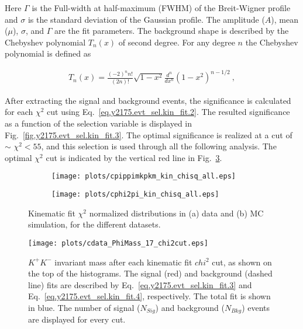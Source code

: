 \noindent Here $\Gamma$ is the Full-width at half-maximum (FWHM) of the Breit-Wigner profile and $\sigma$ is the standard deviation of the Gaussian profile. The amplitude ($A$), mean ($\mu$),  $\sigma$, and $\Gamma$ are the fit parameters. The background shape is described by the Chebyshev polynomial $T_n(x)$ of second degree. For any degree $n$ the Chebyshev polynomial is defined as
 
\begin{equation}
    \label{eq.y2175.evt_sel.kin_fit.4}
    \begin{aligned}
        T_n(x) = \frac{(-2)^{n}n!}{(2n)!}\sqrt{1-x^2}\frac{d^n}{dx^n}(1-x^2)^{n-1/2}~,
    \end{aligned}
\end{equation}

After extracting the signal and background events, the significance is calculated for each $\chi^{2}$ cut using Eq.~\ref{eq.y2175.evt_sel.kin_fit.2}. The resulted significance as a function of the selection variable is displayed in Fig.~\ref{fig.y2175.evt_sel.kin_fit.3}. The optimal significance is realized at a cut of $\sim$ $\chi^2<55$, and this selection is used through all the following analysis. The optimal $\chi^{2}$ cut is indicated by the vertical red line in Fig.~\ref{fig.y2175.evt_sel.kin_fit.1}.

\begin{figure}[H]
    \centering
    \begin{subfigure}[b]{0.5\textwidth}
        \texttt{[image: plots/cpippimkpkm\_kin\_chisq\_all.eps]}
        \caption{}
        \label{fig.y2175.evt_sel.kin_fit.1.a}
    \end{subfigure}\hfill
    \begin{subfigure}[b]{0.5\textwidth}
        \texttt{[image: plots/cphi2pi\_kin\_chisq\_all.eps]}
        \caption{}
        \label{fig.y2175.evt_sel.kin_fit.1.b}
    \end{subfigure}
    \caption{Kinematic fit $\chi^2$ normalized distributions in (a) data and (b) MC simulation, for the different datasets.}
    \label{fig.y2175.evt_sel.kin_fit.1}
\end{figure}

\begin{figure}[H]
    \centering
        \texttt{[image: plots/cdata\_PhiMass\_17\_chi2cut.eps]}
        \caption{$K^+K^-$ invariant mass after each kinematic fit $chi^2$ cut, as shown on the top of the histograms. The signal (red) and background (dashed line) fits are described by Eq.~\ref{eq.y2175.evt_sel.kin_fit.3} and Eq.~\ref{eq.y2175.evt_sel.kin_fit.4}, respectively. The total fit is shown in blue. The number of signal ($N_{Sig}$) and background ($N_{Bkg}$) events are displayed for every cut.}
        \label{fig.y2175.evt_sel.kin_fit.2}
\end{figure}

